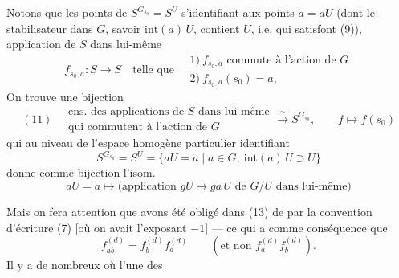\documentclass[11pt,a4paper]{article}
\begin{document}
Notons que les points de $S^{G_{s_0}}=S^{U}$ s'identifiant aux points $\dot{a}=aU$  (dont le stabilisateur dans $G$, savoir $\mathrm{int}(a)\,U$, contient $U$, i.e. qui satisfont (9)),    application de $S$ dans lui-même
\[
f_{s_0,a}:S\longrightarrow S\quad\text{telle que}\quad
\begin{array}{l}
1)\ f_{s_0,a} \text{ commute à l'action de } G\\
2)\ f_{s_0,a}(s_0)=a,
\end{array}
\]
 
On trouve une bijection
\[
(11)\quad
\begin{array}{l}
\text{ens. des applications de } S \text{ dans lui-même}\\
\text{qui commutent à l'action de } G
\end{array}
\xrightarrow{\ \sim\ } S^{G_{s_0}},\qquad f\longmapsto f(s_0)
\]
qui au niveau de l'espace homogène particulier  identifiant
\[
S^{G_{s_0}}=S^{U}=\{aU=\dot{a}\mid a\in G,\ \mathrm{int}(a)\,U\supset U\} \tag{12}
\]
donne comme bijection l'isom. 
\[
aU=\dot{a}\longmapsto\bigl(\text{application } gU\mapsto ga\,U \text{ de } G/U \text{ dans lui-même}\bigr) \tag{13}
\]

Mais on fera attention que   avons été obligé dans (13) de  par  la convention d'écriture (7) [où on avait l'exposant $-1$] — ce qui a comme conséquence que
\[
f_{ab}^{(d)}=f_{b}^{(d)}f_{a}^{(d)}\qquad(\text{et non } f_{a}^{(d)}f_{b}^{(d)}). \tag{14}
\]
Il y a de nombreux  où l'une des
\end{document}
